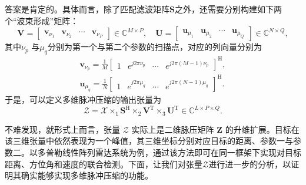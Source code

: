 答案是肯定的。具体而言，除了匹配滤波矩阵\( \mathbf{S} \)之外，还需要分别构建如下两个``波束形成''矩阵：
\[
    \mathbf{V} = \begin{bmatrix}
        \bm{v}_{\nu_1} & \bm{v}_{\nu_2} & \cdots & \bm{v}_{\nu_P}
    \end{bmatrix} \in \mathbb{C}^{M \times P}, \quad
    \mathbf{U} = \begin{bmatrix}
        \bm{u}_{\mu_1} & \bm{u}_{\mu_2} & \cdots & \bm{u}_{\mu_Q}
    \end{bmatrix} \in \mathbb{C}^{N \times Q},
\]
其中\( \nu_p \) 与\( \mu_q \)分别为第一个与第二个参数的扫描点，对应的列向量分别为
\[
    \begin{split}
        \bm{v}_{\nu_p} = \frac{1}{M} \begin{bmatrix}
                                         1 & e^{j2\pi\nu_p} & \cdots & e^{j2\pi(M-1)\nu_p}
                                     \end{bmatrix}^{\mathrm{H}}, \\
        \bm{u}_{\mu_q} = \frac{1}{N} \begin{bmatrix}
                                         1 & e^{j2\pi\mu_q} & \cdots & e^{j2\pi(N-1)\mu_q}
                                     \end{bmatrix}^{\mathrm{H}}.
    \end{split}
\]
于是，可以定义多维脉冲压缩的输出张量为
\[
    \mathcal{Z} = \mathcal{X} \times_1 \mathbf{S}^{\mathrm{H}} \times_2 \mathbf{V}^{\mathrm{T}} \times_3 \mathbf{U}^{\mathrm{T}} \in \mathbb{C}^{L \times P \times Q}.
\]

不难发现，就形式上而言，张量 \( \mathcal{Z} \) 实际上是二维脉压矩阵 \( \mathbf{Z} \) 的升维扩展。目标在该三维张量中依然表现为一个峰值，其三维坐标分别对应目标的距离、参数一与参数二。以多普勒线性阵列雷达系统为例，通过该方法即可在同一框架下实现对目标距离、方位角和速度的联合检测。下面，让我们对张量\( \mathcal{Z} \)进行进一步的分析，以证明其确实能够实现多维脉冲压缩的功能。

